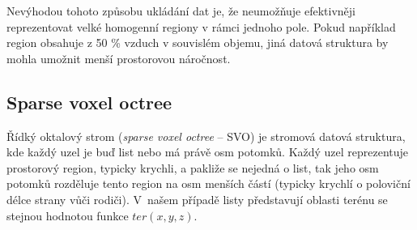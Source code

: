Nevýhodou tohoto způsobu ukládání dat je, že neumožňuje efektivněji reprezentovat velké homogenní regiony v rámci jednoho pole. Pokud například region obsahuje z 50 \% vzduch v souvislém objemu, jiná datová struktura by mohla umožnit menší prostorovou náročnost.

\subsection{Sparse voxel octree}
Řídký oktalový strom (\textit{sparse voxel octree} -- SVO) je stromová datová struktura, kde každý uzel je buď list nebo má právě osm potomků. Každý uzel reprezentuje prostorový region, typicky krychli, a pakliže se nejedná o list, tak jeho osm potomků rozděluje tento region na osm menších částí (typicky krychlí o poloviční délce strany vůči rodiči). V~našem případě listy představují oblasti terénu se stejnou hodnotou funkce $ter(x, y, z)$.

